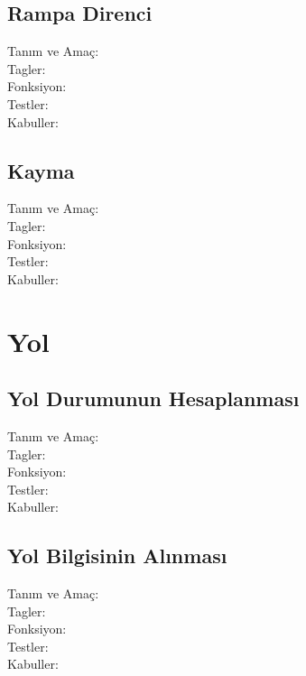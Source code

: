 \documentclass[10pt,a4paper]{article}
\begin{document}
\subsection{Rampa Direnci}
\begin{description}
\item[Tanım ve Amaç:] 
\item[Tagler:]
\item[Fonksiyon:]
\item[Testler:]
\item[Kabuller:]
\end{description}
\newpage

\subsection{Kayma}
\begin{description}
\item[Tanım ve Amaç:] 
\item[Tagler:]
\item[Fonksiyon:]
\item[Testler:]
\item[Kabuller:]
\end{description}

\newpage

\section{Yol}

\subsection{Yol Durumunun Hesaplanması}
\begin{description}
\item[Tanım ve Amaç:] 
\item[Tagler:]
\item[Fonksiyon:]
\item[Testler:]
\item[Kabuller:]
\end{description}
\newpage

\subsection{Yol Bilgisinin Alınması}
\begin{description}
\item[Tanım ve Amaç:] 
\item[Tagler:]
\item[Fonksiyon:]
\item[Testler:]
\item[Kabuller:]
\end{description}
\end{document}
